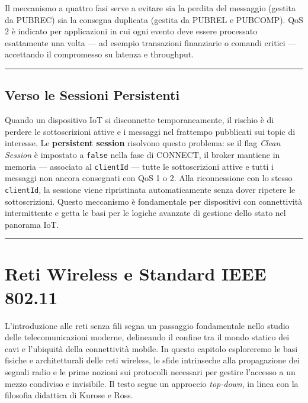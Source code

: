 \documentclass[
  italian,
  openany]{book}
\begin{document}
Il meccanismo a quattro fasi serve a evitare sia la perdita del
messaggio (gestita da PUBREC) sia la consegna duplicata (gestita da
PUBREL e PUBCOMP). QoS 2 è indicato per applicazioni in cui ogni evento
deve essere processato esattamente una volta --- ad esempio transazioni
finanziarie o comandi critici --- accettando il compromesso su latenza e
throughput.

\begin{center}\rule{0.5\linewidth}{0.5pt}\end{center}

\section{Verso le Sessioni
Persistenti}\label{verso-le-sessioni-persistenti}

Quando un dispositivo IoT si disconnette temporaneamente, il rischio è
di perdere le sottoscrizioni attive e i messaggi nel frattempo
pubblicati sui topic di interesse. Le \textbf{persistent session}
risolvono questo problema: se il flag \emph{Clean Session} è impostato a
\texttt{false} nella fase di CONNECT, il broker mantiene in memoria ---
associato al \texttt{clientId} --- tutte le sottoscrizioni attive e
tutti i messaggi non ancora consegnati con QoS 1 o 2. Alla riconnessione
con lo stesso \texttt{clientId}, la sessione viene ripristinata
automaticamente senza dover ripetere le sottoscrizioni. Questo
meccanismo è fondamentale per dispositivi con connettività intermittente
e getta le basi per le logiche avanzate di gestione dello stato nel
panorama IoT.

\begin{center}\rule{0.5\linewidth}{0.5pt}\end{center}

\newpage

\chapter{Reti Wireless e Standard IEEE
802.11}\label{reti-wireless-e-standard-ieee-802.11}

L'introduzione alle reti senza fili segna un passaggio fondamentale
nello studio delle telecomunicazioni moderne, delineando il confine tra
il mondo statico dei cavi e l'ubiquità della connettività mobile. In
questo capitolo esploreremo le basi fisiche e architetturali delle reti
wireless, le sfide intrinseche alla propagazione dei segnali radio e le
prime nozioni sui protocolli necessari per gestire l'accesso a un mezzo
condiviso e invisibile. Il testo segue un approccio \emph{top-down}, in
linea con la filosofia didattica di Kurose e Ross.
\end{document}
